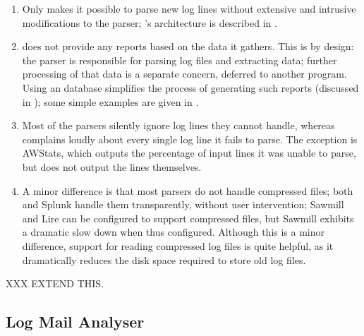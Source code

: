 \begin{enumerate}

    \item Only \parsername{} makes it possible to parse new log lines
        without extensive and intrusive modifications to the parser;
        \parsername{}'s architecture is described in .

    \item \parsername{} does not provide any reports based on the data it
        gathers.  This is by design: the parser is responsible for parsing
        log files and extracting data; further processing of that data is a
        separate concern, deferred to another program.  Using an \SQL{}
        database simplifies the process of generating such reports
        (discussed in ); some simple examples
        are given in .

    \item Most of the parsers silently ignore log lines they cannot handle,
        whereas \parsername{} complains loudly about every single log line
        it fails to parse.  The exception is AWStats, which outputs the
        percentage of input lines it was unable to parse, but does not
        output the lines themselves.

    \item A minor difference is that most parsers do not handle compressed
        files; both \parsername{} and Splunk handle them transparently,
        without user intervention; Sawmill and Lire can be configured to
        support compressed files, but Sawmill exhibits a dramatic slow down
        when thus configured.  Although this is a minor difference, support
        for reading compressed log files is quite helpful, as it
        dramatically reduces the disk space required to store old log
        files.

\end{enumerate}

XXX EXTEND THIS\@.

\subsection{Log Mail Analyser}

\label{prior art}

